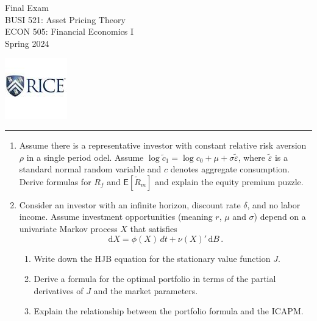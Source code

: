 \documentclass[english,12pt]{amsart}
\newcommand{\D}{\mathrm{d}}
\newcommand{\mye}{\mathsf{E}}
\begin{document}
\begin{minipage}[t]{0.5\textwidth}
\vspace*{-1in}Final Exam\\
BUSI 521: Asset Pricing Theory \\ ECON 505: Financial Economics I\\Spring 2024
\end{minipage}%
\begin{minipage}[t]{0.5\textwidth}
\raggedleft
\includegraphics[scale=1]{rice.jpg}
\end{minipage}%
\begin{center}
\vspace*{-0.35in}
\rule{\textwidth}{0.4pt}
\end{center}

\vskip 0.5in
\begin{enumerate}\renewcommand{\labelenumi}{\arabic{enumi}}
\item  Assume there is a representative investor with constant relative risk aversion $\rho$ in a single period odel.  Assume $\log \tilde c_1 = \log c_0 + \mu + \sigma \tilde \varepsilon$, where $\tilde \varepsilon$ is a standard normal random variable and $c$ denotes aggregate consumption.  Derive formulas for $R_f$ and $\mye[\tilde R_m]$ and explain the equity premium puzzle.

\item Consider an investor with an infinite horizon, discount rate $\delta$, and no labor income.  Assume investment opportunities (meaning $r$, $\mu$ and $\sigma$) depend on a univariate Markov process $X$ that satisfies
$$\D X = \phi(X)\,d t + \nu(X)'\,\D B\,.$$
\begin{enumerate}\renewcommand{\labelenumii}{\alph{enumii}}
\item Write down the HJB equation for the stationary value function $J$.
\item Derive a formula for the optimal portfolio in terms of the partial derivatives of $J$ and the market parameters. 
\item Explain the relationship between the portfolio formula and the ICAPM.
\end{enumerate}
\end{enumerate}

\end{document}
